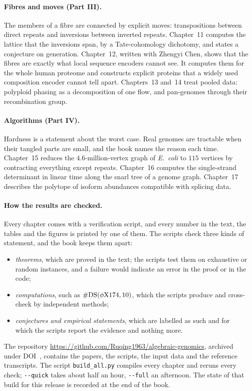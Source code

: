 \paragraph{Fibres and moves (Part III).} The members of a fibre are connected by explicit moves:
transpositions between direct repeats and inversions between inverted repeats. Chapter~11 computes
the lattice that the inversions span, by a Tate-cohomology dichotomy, and states a conjecture on
generation. Chapter~12, written with Zhengyi Chen, shows that the fibres are exactly what local
sequence encoders cannot see. It computes them for the whole human proteome and constructs explicit
proteins that a widely used composition encoder cannot tell apart. Chapters~13 and~14 treat pooled
data: polyploid phasing as a decomposition of one flow, and pan-genomes through their recombination
group.

\paragraph{Algorithms (Part IV).} Hardness is a statement about the worst case. Real genomes are
tractable when their tangled parts are small, and the book names the reason each time. Chapter~15
reduces the $4.6$-million-vertex graph of \emph{E.~coli} to $115$ vertices by contracting everything
except repeats. Chapter~16 computes the single-strand determinant in linear time along the snarl tree
of a genome graph. Chapter~17 describes the polytope of isoform abundances compatible with splicing
data.

\paragraph{How the results are checked.} Every chapter comes with a verification script, and every
number in the text, the tables and the figures is printed by one of them. The scripts check three
kinds of statement, and the book keeps them apart:
\begin{itemize}
\item \emph{theorems}, which are proved in the text; the scripts test them on exhaustive or random
instances, and a failure would indicate an error in the proof or in the code;
\item \emph{computations}, such as $\#\mathrm{DS}(\phi\mathrm X174,10)$, which the scripts produce and
cross-check by independent methods;
\item \emph{conjectures and empirical statements}, which are labelled as such and for which the
scripts report the evidence and nothing more.
\end{itemize}
The repository \url{https://github.com/Ruqing1963/algebraic-genomics}, archived under
DOI~\href{https://doi.org/\AGdoi}{\texttt{\AGdoi}}, contains the papers, the scripts, the input data
and the reference transcripts. The script \texttt{build\_all.py} compiles every chapter and reruns
every check; \texttt{-{}-quick} takes about half an hour, \texttt{-{}-full} an afternoon. The state of
that build for this release is recorded at the end of the book.

